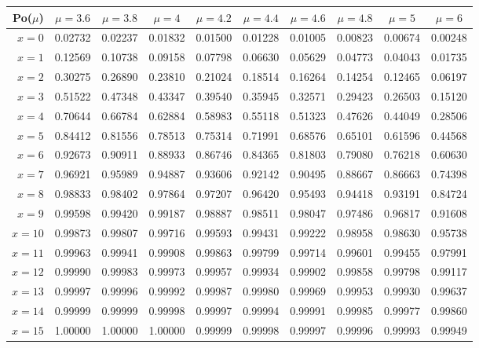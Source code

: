 \vspace{8pt minus 6pt}
\begin{tabular}{r|ccccccccc}
Po($\mu$)& $\mu=3.6$ & $\mu=3.8$ & $\mu=4$ & $\mu=4.2$ & $\mu=4.4$ & $\mu=4.6$ & $\mu=4.8$ & $\mu=5$ & $\mu=6$ \\\hline
$x= 0$&0.02732&0.02237&0.01832&0.01500&0.01228&0.01005&0.00823&0.00674&0.00248\\
$x= 1$&0.12569&0.10738&0.09158&0.07798&0.06630&0.05629&0.04773&0.04043&0.01735\\
$x= 2$&0.30275&0.26890&0.23810&0.21024&0.18514&0.16264&0.14254&0.12465&0.06197\\
$x= 3$&0.51522&0.47348&0.43347&0.39540&0.35945&0.32571&0.29423&0.26503&0.15120\\
$x= 4$&0.70644&0.66784&0.62884&0.58983&0.55118&0.51323&0.47626&0.44049&0.28506\\
$x= 5$&0.84412&0.81556&0.78513&0.75314&0.71991&0.68576&0.65101&0.61596&0.44568\\
$x= 6$&0.92673&0.90911&0.88933&0.86746&0.84365&0.81803&0.79080&0.76218&0.60630\\
$x= 7$&0.96921&0.95989&0.94887&0.93606&0.92142&0.90495&0.88667&0.86663&0.74398\\
$x= 8$&0.98833&0.98402&0.97864&0.97207&0.96420&0.95493&0.94418&0.93191&0.84724\\
$x= 9$&0.99598&0.99420&0.99187&0.98887&0.98511&0.98047&0.97486&0.96817&0.91608\\
$x=10$&0.99873&0.99807&0.99716&0.99593&0.99431&0.99222&0.98958&0.98630&0.95738\\
$x=11$&0.99963&0.99941&0.99908&0.99863&0.99799&0.99714&0.99601&0.99455&0.97991\\
$x=12$&0.99990&0.99983&0.99973&0.99957&0.99934&0.99902&0.99858&0.99798&0.99117\\
$x=13$&0.99997&0.99996&0.99992&0.99987&0.99980&0.99969&0.99953&0.99930&0.99637\\
$x=14$&0.99999&0.99999&0.99998&0.99997&0.99994&0.99991&0.99985&0.99977&0.99860\\
$x=15$&1.00000&1.00000&1.00000&0.99999&0.99998&0.99997&0.99996&0.99993&0.99949\\

\end{tabular}

